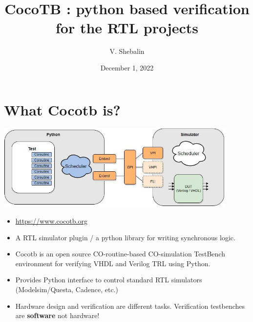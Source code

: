 \documentclass[aspectratio=169]{beamer}
\title[]{\bf CocoTB : python based verification for the RTL projects}
\author{V. Shebalin}
\institute{\inst{}
{\textit {}}
}
\date[]{December 1,  2022}
\begin{document}
\frame{\titlepage
}

\footnotesize

\section*{What Cocotb is?}
\begin{frame}{\secname}

  \centering
  \includegraphics[width=0.9\textwidth]{figs/cocotb_overview.jpg}
  
  \begin{itemize}%
    \item \url{https://www.cocotb.org}
    \item A RTL simulator plugin / a python library for writing synchronous logic.
    \item Cocotb is an open source CO-routine-based CO-simulation TestBench
      environment for verifying VHDL and Verilog TRL using Python.
    \item Provides Python interface to control standard RTL simulators (Modelsim/Questa, Cadence, etc.)
    \item Hardware design and verification are different tasks. Verification testbenches are {\bf software} not hardware!


  \end{itemize}
\end{frame}

\end{document}
